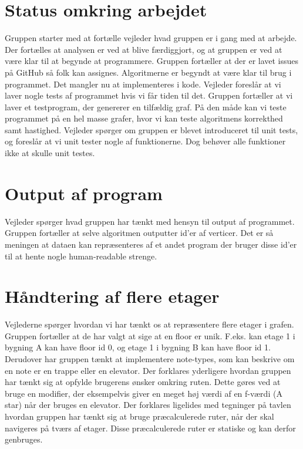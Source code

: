 \documentclass[article,11pt]{memoir}
\begin{document}
\section{Status omkring arbejdet}
Gruppen starter med at fortælle vejleder hvad gruppen er i gang med at arbejde. Der fortælles at analysen er ved at blive færdiggjort, og at gruppen er ved at være klar til at begynde at programmere. Gruppen fortæller at der er lavet issues på GitHub så folk kan assignes. Algoritmerne er begyndt at være klar til brug i programmet. Det mangler nu at implementeres i kode. Vejleder foreslår at vi laver nogle tests af programmet hvis vi får tiden til det. Gruppen fortæller at vi laver et testprogram, der genererer en tilfældig graf. På den måde kan vi teste programmet på en hel masse grafer, hvor vi kan teste algoritmens korrekthed samt hastighed. Vejleder spørger om gruppen er blevet introduceret til unit tests, og foreslår at vi unit tester nogle af funktionerne. Dog behøver alle funktioner ikke at skulle unit testes. 

\section{Output af program}
Vejleder spørger hvad gruppen har tænkt med hensyn til output af programmet. Gruppen fortæller at selve algoritmen outputter id'er af verticer. Det er så meningen at dataen kan repræsenteres af et andet program der bruger disse id'er til at hente nogle human-readable strenge.


\section{Håndtering af flere etager}
Vejlederne spørger hvordan vi har tænkt os at repræsentere flere etager i grafen. Gruppen fortæller at de har valgt at sige at en floor er unik. F.eks. kan etage 1 i bygning A kan have floor id 0, og etage 1 i bygning B kan have floor id 1. Derudover har gruppen tænkt at implementere note-types, som kan beskrive om en note er en trappe eller en elevator. Der forklares yderligere hvordan gruppen har tænkt sig at opfylde brugerens ønsker omkring ruten. Dette gøres ved at bruge en modifier, der eksempelvis giver en meget høj værdi af en f-værdi (A star) når der bruges en elevator. Der forklares ligelides med tegninger på tavlen hvordan gruppen har tænkt sig at bruge præcalculerede ruter, når der skal navigeres på tværs af etager. Disse præcalculerede ruter er statiske og kan derfor genbruges. 
\end{document}
